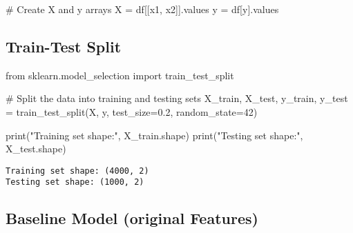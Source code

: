 \documentclass[
  letterpaper,
  DIV=11,
  numbers=noendperiod]{scrreprt}
\newenvironment{Shaded}{\begin{snugshade}}{\end{snugshade}}
\newcommand{\BuiltInTok}[1]{\textcolor[rgb]{0.00,0.23,0.31}{#1}}
\newcommand{\CommentTok}[1]{\textcolor[rgb]{0.37,0.37,0.37}{#1}}
\newcommand{\DecValTok}[1]{\textcolor[rgb]{0.68,0.00,0.00}{#1}}
\newcommand{\FloatTok}[1]{\textcolor[rgb]{0.68,0.00,0.00}{#1}}
\newcommand{\ImportTok}[1]{\textcolor[rgb]{0.00,0.46,0.62}{#1}}
\newcommand{\NormalTok}[1]{\textcolor[rgb]{0.00,0.23,0.31}{#1}}
\newcommand{\OperatorTok}[1]{\textcolor[rgb]{0.37,0.37,0.37}{#1}}
\newcommand{\StringTok}[1]{\textcolor[rgb]{0.13,0.47,0.30}{#1}}
\begin{document}
\begin{Shaded}
\begin{Highlighting}[]
\CommentTok{\# Create X and y arrays}
\NormalTok{X }\OperatorTok{=}\NormalTok{ df[[}\StringTok{\textquotesingle{}x1\textquotesingle{}}\NormalTok{, }\StringTok{\textquotesingle{}x2\textquotesingle{}}\NormalTok{]].values}
\NormalTok{y }\OperatorTok{=}\NormalTok{ df[}\StringTok{\textquotesingle{}y\textquotesingle{}}\NormalTok{].values}
\end{Highlighting}
\end{Shaded}

\subsection{Train-Test Split}\label{train-test-split}

\begin{Shaded}
\begin{Highlighting}[]
\ImportTok{from}\NormalTok{ sklearn.model\_selection }\ImportTok{import}\NormalTok{ train\_test\_split}

\CommentTok{\# Split the data into training and testing sets}
\NormalTok{X\_train, X\_test, y\_train, y\_test }\OperatorTok{=}\NormalTok{ train\_test\_split(X, y, test\_size}\OperatorTok{=}\FloatTok{0.2}\NormalTok{, random\_state}\OperatorTok{=}\DecValTok{42}\NormalTok{)}

\BuiltInTok{print}\NormalTok{(}\StringTok{"Training set shape:"}\NormalTok{, X\_train.shape)}
\BuiltInTok{print}\NormalTok{(}\StringTok{"Testing set shape:"}\NormalTok{, X\_test.shape)}
\end{Highlighting}
\end{Shaded}

\begin{verbatim}
Training set shape: (4000, 2)
Testing set shape: (1000, 2)
\end{verbatim}

\subsection{Baseline Model (original
Features)}\label{baseline-model-original-features}
\end{document}
